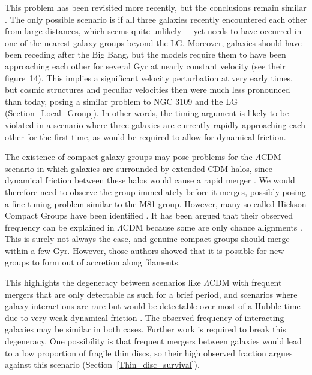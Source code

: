 \documentclass[fleqn,usenatbib,useAMS,onecolumn]{mnras} %
\begin{document}
This problem has been revisited more recently, but the conclusions remain similar \citep*{Oehm_2017}. The only possible scenario is if all three galaxies recently encountered each other from large distances, which seems quite unlikely $-$ yet needs to have occurred in one of the nearest galaxy groups beyond the LG. Moreover, galaxies should have been receding after the Big Bang, but the models require them to have been approaching each other for several Gyr at nearly constant velocity (see their figure~14). This implies a significant velocity perturbation at very early times, but cosmic structures and peculiar velocities then were much less pronounced than today, posing a similar problem to NGC 3109 and the LG (Section~\ref{Local_Group}). In other words, the timing argument is likely to be violated in a scenario where three galaxies are currently rapidly approaching each other for the first time, as would be required to allow for dynamical friction.

The existence of compact galaxy groups may pose problems for the $\Lambda$CDM scenario in which galaxies are surrounded by extended CDM halos, since dynamical friction between these halos would cause a rapid merger \citep{Privon_2013, Kroupa_2015}. We would therefore need to observe the group immediately before it merges, possibly posing a fine-tuning problem similar to the M81 group. However, many so-called Hickson Compact Groups have been identified \citep{Hickson_1982, Sohn_2015, Sohn_2016}. It has been argued that their observed frequency can be explained in $\Lambda$CDM because some are only chance alignments \citep{Hartsuiker_2020}. This is surely not always the case, and genuine compact groups should merge within a few Gyr. However, those authors showed that it is possible for new groups to form out of accretion along filaments.

This highlights the degeneracy between scenarios like $\Lambda$CDM with frequent mergers that are only detectable as such for a brief period, and scenarios where galaxy interactions are rare but would be detectable over most of a Hubble time due to very weak dynamical friction \citep{Renaud_2016}. The observed frequency of interacting galaxies may be similar in both cases. Further work is required to break this degeneracy. One possibility is that frequent mergers between galaxies would lead to a low proportion of fragile thin discs, so their high observed fraction argues against this scenario (Section~\ref{Thin_disc_survival}).
\end{document}
